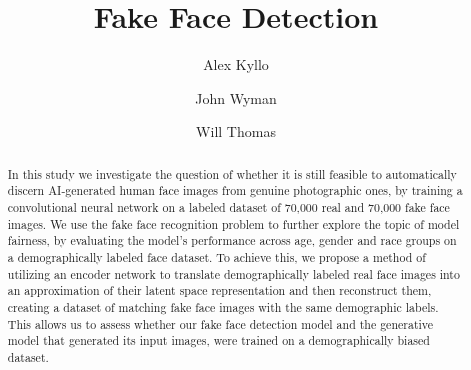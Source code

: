 \documentclass[12pt, letterpaper]{article}
\title{Fake Face Detection}
\author{
  Alex Kyllo
  \and
  John Wyman
  \and
  Will Thomas
}
\begin{document}
\maketitle

\begin{abstract}
  In this study we investigate the question of whether it is still feasible to
  automatically discern AI-generated human face images from genuine photographic
  ones, by training a convolutional neural network on a labeled dataset of
  70,000 real and 70,000 fake face images.
  We use the fake face recognition problem to further explore the topic of
  model fairness, by evaluating the model's performance across age, gender
  and race groups on a demographically labeled face dataset. To achieve this, we
  propose a method of utilizing an encoder network to translate demographically
  labeled real face images into an approximation of their latent space
  representation and then reconstruct them, creating a dataset of matching fake
  face images with the same demographic labels. This allows us to assess whether
  our fake face detection model and the generative model that generated its
  input images, were trained on a demographically biased dataset.
\end{abstract}
\end{document}
